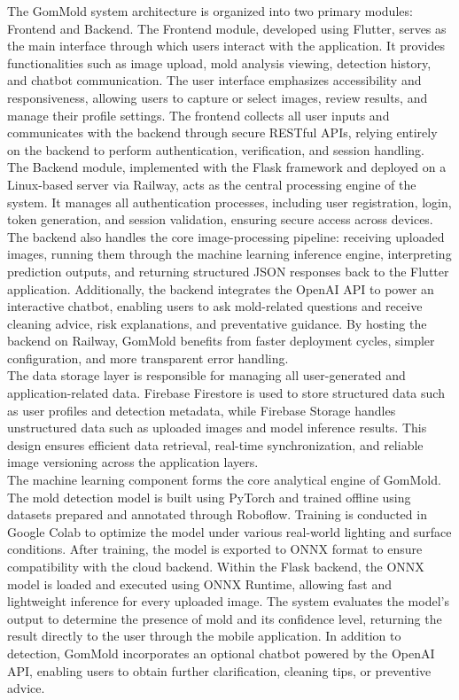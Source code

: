 \documentclass[conference]{IEEEtran}
\begin{document}
The GomMold system architecture is organized into two primary modules: Frontend and Backend. The Frontend module, developed using Flutter, serves as the main interface through which users interact with the application. It provides functionalities such as image upload, mold analysis viewing, detection history, and chatbot communication. The user interface emphasizes accessibility and responsiveness, allowing users to capture or select images, review results, and manage their profile settings. The frontend collects all user inputs and communicates with the backend through secure RESTful APIs, relying entirely on the backend to perform authentication, verification, and session handling.\\

The Backend module, implemented with the Flask framework and deployed on a Linux-based server via Railway, acts as the central processing engine of the system. It manages all authentication processes, including user registration, login, token generation, and session validation, ensuring secure access across devices. The backend also handles the core image-processing pipeline: receiving uploaded images, running them through the machine learning inference engine, interpreting prediction outputs, and returning structured JSON responses back to the Flutter application. Additionally, the backend integrates the OpenAI API to power an interactive chatbot, enabling users to ask mold-related questions and receive cleaning advice, risk explanations, and preventative guidance. By hosting the backend on Railway, GomMold benefits from faster deployment cycles, simpler configuration, and more transparent error handling.\\

The data storage layer is responsible for managing all user-generated and application-related data. Firebase Firestore is used to store structured data such as user profiles and detection metadata, while Firebase Storage handles unstructured data such as uploaded images and model inference results. This design ensures efficient data retrieval, real-time synchronization, and reliable image versioning across the application layers.\\

The machine learning component forms the core analytical engine of GomMold. The mold detection model is built using PyTorch and trained offline using datasets prepared and annotated through Roboflow. Training is conducted in Google Colab to optimize the model under various real-world lighting and surface conditions. After training, the model is exported to ONNX format to ensure compatibility with the cloud backend. Within the Flask backend, the ONNX model is loaded and executed using ONNX Runtime, allowing fast and lightweight inference for every uploaded image. The system evaluates the model’s output to determine the presence of mold and its confidence level, returning the result directly to the user through the mobile application. In addition to detection, GomMold incorporates an optional chatbot powered by the OpenAI API, enabling users to obtain further clarification, cleaning tips, or preventive advice.\\
\end{document}
